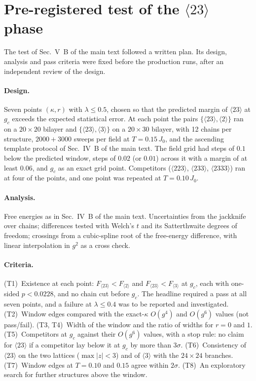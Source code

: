\documentclass[aps,prb,twocolumn,superscriptaddress,floatfix]{revtex4-2}
\begin{document}
\section{Pre-registered test of the $\langle23\rangle$ phase}

The test of Sec.~V~B of the main text followed a written plan. Its design, analysis and pass criteria were fixed before
the production runs, after an independent review of the design.

\paragraph*{Design.} Seven points $(\kappa,r)$ with $\lambda\le0.5$, chosen so that the predicted margin
of $\langle23\rangle$ at $g_c$ exceeds the expected statistical error. At each point the pairs
$\{\langle23\rangle,\langle2\rangle\}$ ran on a $20\times20$ bilayer and $\{\langle23\rangle,\langle3\rangle\}$ on
a $20\times30$ bilayer, with 12 chains per structure, $2000+3000$ sweeps per field at $T=0.15\,J_0$, and
the ascending template protocol of Sec.~IV~B of the main text. The field grid had steps of $0.1$ below the
predicted window, steps of $0.02$ (or $0.01$) across it with a margin of at least $0.06$, and $g_c$ as an
exact grid point. Competitors ($\langle223\rangle$, $\langle233\rangle$, $\langle2333\rangle$) ran at four of
the points, and one point was repeated at $T=0.10\,J_0$.

\paragraph*{Analysis.} Free energies as in Sec.~IV~B of the main text. Uncertainties from the jackknife
over chains; differences tested with Welch's $t$ and its Satterthwaite degrees of freedom; crossings
from a cubic-spline root of the free-energy difference, with linear interpolation in $g^2$ as a cross
check.

\paragraph*{Criteria.}
(T1)~Existence at each point: $F_{\langle23\rangle}<F_{\langle2\rangle}$ and $F_{\langle23\rangle}<F_{\langle3\rangle}$
at $g_c$, each with one-sided $p<0.0228$, and no chain cut before $g_c$. The headline required a pass at
all seven points, and a failure at $\lambda\le0.4$ was to be reported and investigated.
(T2)~Window edges compared with the exact-$\kappa$ $O(g^4)$ and $O(g^6)$ values (not pass/fail).
(T3, T4)~Width of the window and the ratio of widths for $r=0$ and $1$.
(T5)~Competitors at $g_c$ against their $O(g^6)$ values, with a stop rule: no claim for
$\langle23\rangle$ if a competitor lay below it at $g_c$ by more than $3\sigma$.
(T6)~Consistency of $\langle23\rangle$ on the two lattices ($\max|z|<3$) and of $\langle3\rangle$ with the
$24\times24$ branches.
(T7)~Window edges at $T=0.10$ and $0.15$ agree within $2\sigma$.
(T8)~An exploratory search for further structures above the window.
\end{document}
